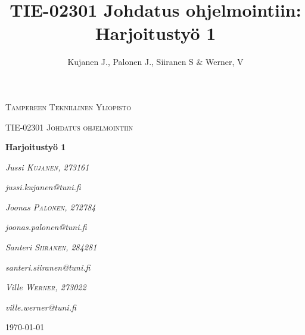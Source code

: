 \documentclass[12pt]{report} %
\title{TIE-02301 Johdatus ohjelmointiin: Harjoitustyö 1}
\author{Kujanen J., Palonen J., Siiranen S \& Werner, V}
\begin{document}

    \begin{titlepage}
        \centering
        {\scshape\LARGE Tampereen Teknillinen Yliopisto \par}
        \vspace{1cm}
        {\scshape\Large TIE-02301 Johdatus ohjelmointiin\par}
        \vspace{2.5cm}
        {\huge\bfseries Harjoitustyö 1 \par}
        \vspace{4cm}
        {\hspace{2cm}\Large\itshape{Jussi} \textsc{Kujanen}, \textit{273161} \newline}
	    {\quad\textit{jussi.kujanen@tuni.fi }\par }
        {\hspace{2cm}\Large\itshape Joonas \textsc{Palonen}, \textit{272784}\newline}
	    {\quad \textit{joonas.palonen@tuni.fi} \par}
        {\hspace{2cm}\Large\itshape Santeri \textsc{Siiranen}, \textit{284281}\newline}
	    {\quad \textit{santeri.siiranen@tuni.fi} \par }
        {\hspace{2cm}\Large\itshape Ville \textsc{Werner}, \textit{273022}\newline}
	    {\quad \quad \textit{ville.werner@tuni.fi} \par}
        
        \vfill
    
        \vfill
    
        {\large \today \par}
    \end{titlepage}

    
    \setcounter{page}{1}                    %
    
\end{document}
